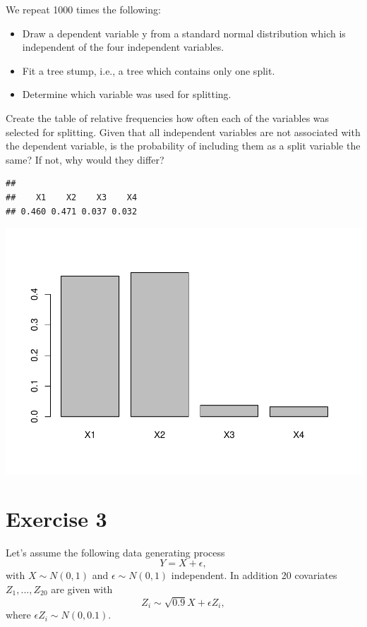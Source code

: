\documentclass[
]{article}
\begin{document}
We repeat 1000 times the following:

\begin{itemize}
  \item Draw a dependent variable y from a standard normal distribution which is independent of the four independent variables.
  \item Fit a tree stump, i.e., a tree which contains only one split.
  \item Determine which variable was used for splitting.
\end{itemize}

Create the table of relative frequencies how often each of the variables
was selected for splitting. Given that all independent variables are not
associated with the dependent variable, is the probability of including
them as a split variable the same? If not, why would they differ?

\begin{verbatim}
## 
##    X1    X2    X3    X4 
## 0.460 0.471 0.037 0.032
\end{verbatim}

\includegraphics{A3_files/figure-latex/unnamed-chunk-10-1.pdf}

\section{Exercise 3}\label{exercise-3}

Let's assume the following data generating process
\[ Y = X + \epsilon, \] with \(X \sim N(0,1)\) and
\(\epsilon \sim N(0,1)\) independent. In addition 20 covariates
\(Z_1, ... ,Z_{20}\) are given with
\[Z_i \sim \sqrt{0.9}X + \epsilon Z_i ,\] where
\(\epsilon Z_i \sim N(0, 0.1).\)
\end{document}
